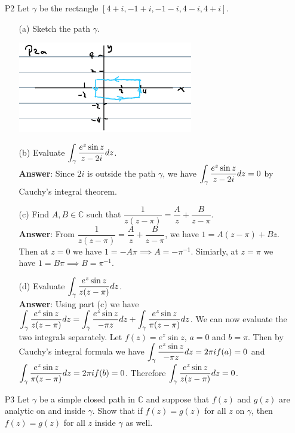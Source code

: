 \documentclass{article}
\begin{document}
\begin{itemize}
      \item [P2] Let $\gamma$ be the rectangle $[4+i,-1+i,-1-i,4-i,4+i]$.
            \begin{itemize}
                  \item [(a)] Sketch the path $\gamma$.
                        \begin{center}
                              \includegraphics[width=3in]{p3a.png}
                        \end{center}
                  \item [(b)] Evaluate $\mathlarger{\int_\gamma\frac{e^z\sin z}{z-2i}dz}$.\\
                        \textbf{Answer}: Since $2i$ is outside the path $\gamma$, we have $\mathlarger{\int_\gamma\frac{e^z\sin z}{z-2i}dz}=0$ by Cauchy's integral theorem.
                  \item [(c)] Find $A,B\in\mathbb{C}$ such that $\dfrac{1}{z(z-\pi)}=\dfrac{A}{z}+\dfrac{B}{z-\pi}$.\\
                        \textbf{Answer}: From $\dfrac{1}{z(z-\pi)}=\dfrac{A}{z}+\dfrac{B}{z-\pi}$, we have $1=A(z-\pi)+Bz$. Then at $z=0$ we have $1=-A\pi\implies A=-\pi^{-1}$. Simiarly, at $z=\pi$ we have $1=B\pi\implies B=\pi^{-1}$.
                  \item [(d)] Evaluate $\mathlarger{\int_\gamma\frac{e^z\sin z}{z(z-\pi)}dz}$.\\
                        \textbf{Answer}: Using part (c) we have $\mathlarger{\int_\gamma\frac{e^z\sin z}{z(z-\pi)}dz=\int_\gamma\frac{e^z\sin z}{-\pi z}dz+\int_\gamma\frac{e^z\sin z}{\pi(z-\pi)}dz}$. We can now evaluate the two integrals separately. Let $f(z)=e^z\sin z$, $a=0$ and $b=\pi$. Then by Cauchy's integral formula we have $\mathlarger{\int_\gamma\frac{e^z\sin z}{-\pi z}dz=2\pi if(a)}=0$ and $\mathlarger{\int_\gamma\frac{e^z\sin z}{\pi(z-\pi)}dz=2\pi if(b)=0}$. Therefore $\mathlarger{\int_\gamma\frac{e^z\sin z}{z(z-\pi)}dz}=0$.
            \end{itemize}
      \item [P3] Let $\gamma$ be a simple closed path in $\mathbb{C}$ and suppose that $f(z)$ and $g(z)$ are analytic on and inside $\gamma$. Show that if $f(z)=g(z)$ for all $z$ on $\gamma$, then $f(z)=g(z)$ for all $z$ inside $\gamma$ as well.\\

\end{itemize}
\end{document}
